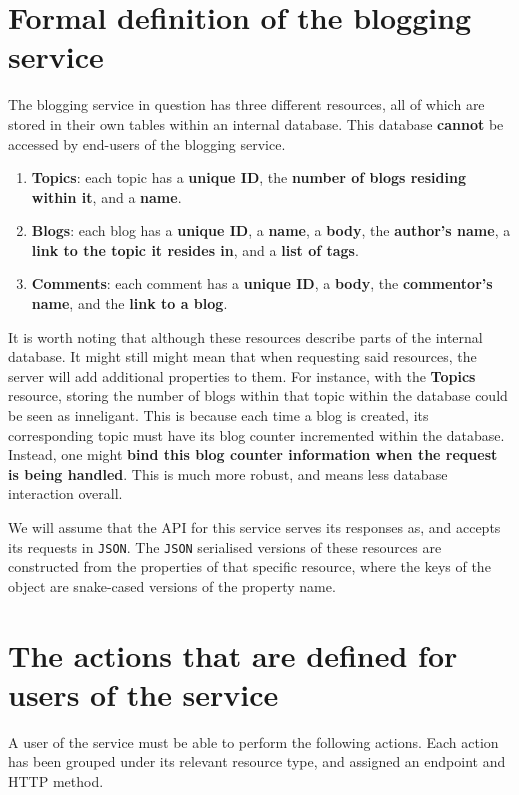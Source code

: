 \documentclass[]{full}
\theoremstyle{definition}
\begin{document}
\section{Formal definition of the blogging service}

The blogging service in question has three different resources, all of which are stored in their own tables within an internal database. This database \textbf{cannot} be accessed by end-users of the blogging service.

\begin{enumerate}
    \item \textbf{Topics}: each topic has a \textbf{unique ID}, the \textbf{number of blogs residing within it}, and a \textbf{name}.
    \item \textbf{Blogs}: each blog has a \textbf{unique ID}, a \textbf{name}, a \textbf{body}, the \textbf{author's name}, a \textbf{link to the topic it resides in}, and a \textbf{list of tags}.
    \item \textbf{Comments}: each comment has a \textbf{unique ID}, a \textbf{body}, the \textbf{commentor's name}, and the \textbf{link to a blog}.
\end{enumerate}

It is worth noting that although these resources describe parts of the internal database. It might still might mean that when requesting said resources, the server will add additional properties to them. For instance, with the \textbf{Topics} resource, storing the number of blogs within that topic within the database could be seen as inneligant. This is because each time a blog is created, its corresponding topic must have its blog counter incremented within the database. Instead, one might \textbf{bind this blog counter information when the request is being handled}. This is much more robust, and means less database interaction overall.

We will assume that the API for this service serves its responses as, and accepts its requests in \verb|JSON|. The \verb|JSON| serialised versions of these resources are constructed from the properties of that specific resource, where the keys of the object are snake-cased versions of the property name.

\section{The actions that are defined for users of the service}

A user of the service must be able to perform the following actions. Each action has been grouped under its relevant resource type, and assigned an endpoint and HTTP method.
\end{document}
